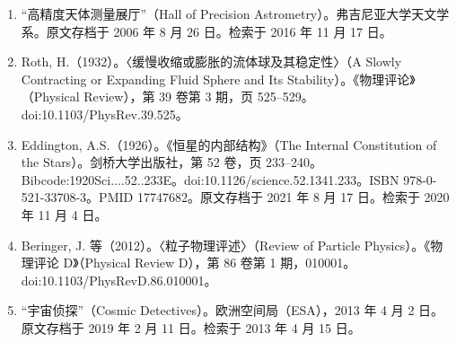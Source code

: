 \begin{enumerate}
  \item “高精度天体测量展厅”（Hall of Precision Astrometry）。弗吉尼亚大学天文学系。原文存档于 2006 年 8 月 26 日。检索于 2016 年 11 月 17 日。
  \item Roth, H.（1932）。〈缓慢收缩或膨胀的流体球及其稳定性〉（A Slowly Contracting or Expanding Fluid Sphere and Its Stability）。《物理评论》（Physical Review），第 39 卷第 3 期，页 525–529。doi:10.1103/PhysRev.39.525。
  \item Eddington, A.S.（1926）。《恒星的内部结构》（The Internal Constitution of the Stars）。剑桥大学出版社，第 52 卷，页 233–240。Bibcode:1920Sci....52..233E。doi:10.1126/science.52.1341.233。ISBN 978-0-521-33708-3。PMID 17747682。原文存档于 2021 年 8 月 17 日。检索于 2020 年 11 月 4 日。%
  \item Beringer, J. 等（2012）。〈粒子物理评述〉（Review of Particle Physics）。《物理评论 D》（Physical Review D），第 86 卷第 1 期，010001。doi:10.1103/PhysRevD.86.010001。
  \item “宇宙侦探”（Cosmic Detectives）。欧洲空间局（ESA），2013 年 4 月 2 日。原文存档于 2019 年 2 月 11 日。检索于 2013 年 4 月 15 日。
\end{enumerate}
